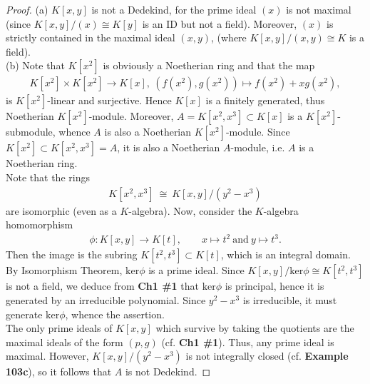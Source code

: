 \documentclass[12pt,a4paper,footinclude=true,headinclude=true]{scrbook} %
\begin{document}
\begin{proof}
    (a) $K[x,y]$ is not a Dedekind, for the prime ideal $(x)$ is not maximal (since $K[x,y]/(x)\cong K[y]$ is an ID but not a field). Moreover, $(x)$ is strictly contained in the maximal ideal $(x,y)$, (where $K[x,y]/(x,y)\cong K$ is a field).\\
    (b) Note that $K[x^2]$ is obviously a Noetherian ring and that the map
    \begin{align*}
        K[x^2]\times K[x^2]\to K[x],\ (f(x^2),g(x^2))\mapsto f(x^2)+xg(x^2),
    \end{align*}
    is $K[x^2]$-linear and surjective. Hence $K[x]$ is a finitely generated, thus Noetherian $K[x^2]$-module. Moreover, $A=K[x^2,x^3]\subset K[x]$ is a $K[x^2]$-submodule, whence $A$ is also a Noetherian $K[x^2]$-module. Since $K[x^2]\subset K[x^2,x^3]=A$, it is also a Noetherian $A$-module, i.e. $A$ is a Noetherian ring.\\
    Note that the rings
    \begin{align*}
        K[x^2,x^3]\ \cong\ K[x,y]/(y^2-x^3)
    \end{align*}
    are isomorphic (even as a $K$-algebra). Now, consider the $K$-algebra homomorphism
    \begin{align*}
        \phi:K[x,y]\to K[t],\qquad x\mapsto t^2\ \text{and}\ y\mapsto t^3.
    \end{align*}
    Then the image is the subring $K[t^2,t^3]\subset K[t]$, which is an integral domain. By Isomorphism Theorem, $\mathrm{ker}\phi$ is a prime ideal. Since $K[x,y]/\mathrm{ker}\phi\cong K[t^2,t^3]$ is not a field, we deduce from \textbf{Ch1 \#1} that $\mathrm{ker}\phi$ is principal, hence it is generated by an irreducible polynomial. Since $y^2-x^3$ is irreducible, it must generate $\mathrm{ker}\phi$, whence the assertion.\\
    The only prime ideals of $K[x,y]$ which survive by taking the quotients are the maximal ideals of the form $(p,g)$ (cf. \textbf{Ch1 \#1}). Thus, any prime ideal is maximal. However, $K[x,y]/(y^2-x^3)$ is not integrally closed (cf. \textbf{Example 103c}), so it follows that $A$ is not Dedekind.
\end{proof}
\end{document}
